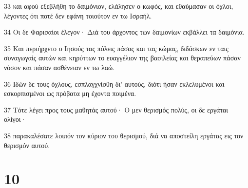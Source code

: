 \par 33 και αφού εξεβλήθη το δαιμόνιον, ελάλησεν ο κωφός, και εθαύμασαν οι όχλοι, λέγοντες ότι ποτέ δεν εφάνη τοιούτον εν τω Ισραήλ.
\par 34 Οι δε Φαρισαίοι έλεγον· Διά του άρχοντος των δαιμονίων εκβάλλει τα δαιμόνια.
\par 35 Και περιήρχετο ο Ιησούς τας πόλεις πάσας και τας κώμας, διδάσκων εν ταις συναγωγαίς αυτών και κηρύττων το ευαγγέλιον της βασιλείας και θεραπεύων πάσαν νόσον και πάσαν ασθένειαν εν τω λαώ.
\par 36 Ιδών δε τους όχλους, εσπλαγχνίσθη δι' αυτούς, διότι ήσαν εκλελυμένοι και εσκορπισμένοι ως πρόβατα μη έχοντα ποιμένα.
\par 37 Τότε λέγει προς τους μαθητάς αυτού· Ο μεν θερισμός πολύς, οι δε εργάται ολίγοι·
\par 38 παρακαλέσατε λοιπόν τον κύριον του θερισμού, διά να αποστείλη εργάτας εις τον θερισμόν αυτού.

\chapter{10}

